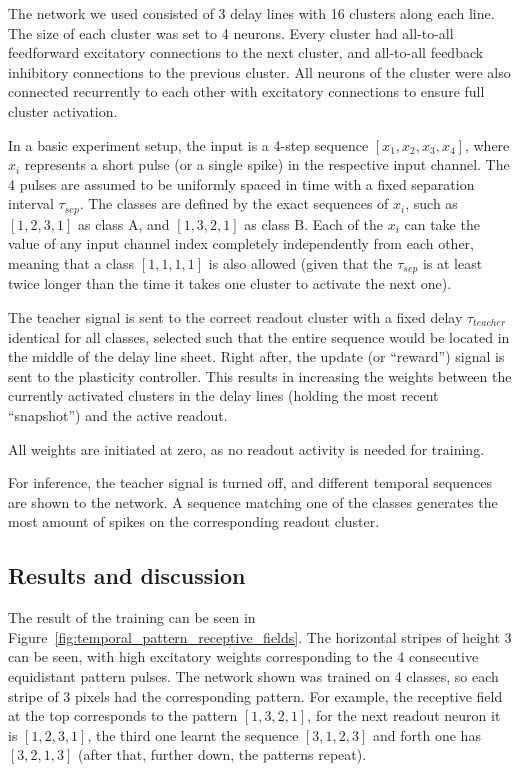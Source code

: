 The network we used consisted of 3 delay lines with 16 clusters along each line. The size of each cluster was set to 4 neurons. Every cluster had all-to-all feedforward excitatory connections to the next cluster, and all-to-all feedback inhibitory connections to the previous cluster. All neurons of the cluster were also connected recurrently to each other with excitatory connections to ensure full cluster activation.

In a basic experiment setup, the input is a 4-step sequence $[x_1, x_2, x_3, x_4]$, where $x_i$ represents a short pulse (or a single spike) in the respective input channel. The 4 pulses are assumed to be uniformly spaced in time with a fixed separation interval $\tau_{sep}$. The classes are defined by the exact sequences of $x_i$, such as $[1, 2, 3, 1]$ as class A, and $[1, 3, 2, 1]$ as class B. Each of the $x_i$ can take the value of any input channel index completely independently from each other, meaning that a class $[1, 1, 1, 1]$ is also allowed (given that the $\tau_{sep}$ is at least twice longer than the time it takes one cluster to activate the next one).

The teacher signal is sent to the correct readout cluster with a fixed delay $\tau_{teacher}$ identical for all classes, selected such that the entire sequence would be located in the middle of the delay line sheet. Right after, the update (or ``reward'') signal is sent to the plasticity controller. This results in increasing the weights between the currently activated clusters in the delay lines (holding the most recent ``snapshot'') and the active readout.

All weights are initiated at zero, as no readout activity is needed for training.

For inference, the teacher signal is turned off, and different temporal sequences are shown to the network. A sequence matching one of the classes generates the most amount of spikes on the corresponding readout cluster.

\subsection{Results and discussion}

The result of the training can be seen in Figure~\ref{fig:temporal_pattern_receptive_fields}. The horizontal stripes of height 3 can be seen, with high excitatory weights corresponding to the 4 consecutive equidistant pattern pulses. The network shown was trained on 4 classes, so each stripe of 3 pixels had the corresponding pattern. For example, the receptive field at the top corresponds to the pattern $[1, 3, 2, 1]$, for the next readout neuron it is $[1, 2, 3, 1]$, the third one learnt the sequence $[3, 1, 2, 3]$ and forth one has $[3, 2, 1, 3]$ (after that, further down, the patterns repeat).

